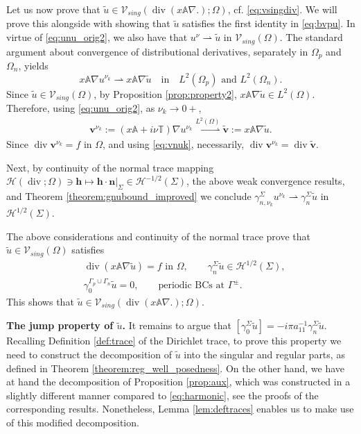 \documentclass[report]{elsarticle}
\numberwithin{theorem}{section}
\renewcommand{\vec}[1]{\mathbf{#1}}
\begin{document}
Let us now prove that $\widetilde{u}\in \mathcal{V}_{sing}(\operatorname{div}(x\mathbb{A}\nabla .); \Omega)$, cf. \eqref{eq:vsingdiv}. We will prove this alongside with showing that $\widetilde{u}$ satisfies the first identity in \eqref{eq:bvpu}. In virtue of \eqref{eq:unu_orig2}, we also have that  $u^{\nu}\rightharpoonup \widetilde{u}$ in $\mathcal{V}_{sing}(\Omega)$. The  standard argument about convergence of distributional derivatives, separately in $\Omega_p$ and $\Omega_n$, yields $$x\mathbb{A}\nabla u^{\nu_k}\rightharpoonup x\mathbb{A}\nabla \widetilde{u}\quad \text{in}\quad  L^2(\Omega_p) \text{ and }L^2(\Omega_n).$$ 
Since $\tilde{u}\in \mathcal{V}_{sing}(\Omega)$, by Proposition \ref{prop:property2}, $x\mathbb{A}\nabla \widetilde{u}\in L^2(\Omega)$. Therefore, using \eqref{eq:unu_orig2}, as $\nu_k\rightarrow 0+$, 
\begin{align}
	\label{eq:vnuk}
	\vec{v}^{\nu_k}:=(x\mathbb{A}+i\nu\mathbb{T})\nabla u^{\nu_k}\overset{L^2(\Omega)}{\rightharpoonup} \widetilde{\vec{v}}:=x\mathbb{A}\nabla \widetilde{u}.
\end{align}
Since $\operatorname{div}\vec{v}^{\nu_k}=f$ in $\Omega$, and using \eqref{eq:vnuk}, necessarily,  $\operatorname{div}\vec{v}^{\nu_k}= \operatorname{div}\widetilde{\vec{v}}.$

Next, by continuity of the normal trace mapping $\mathcal{H}(\operatorname{div};\Omega)\ni\vec{h}\mapsto \left.\vec{h}\cdot \vec{n}\right|_{\Sigma}\in \mathcal{H}^{-1/2}(\Sigma)$, the above weak convergence results, and Theorem \ref{theorem:gnubound_improved} we conclude $\gamma_{n,\nu_k}^{\Sigma}u^{\nu_k}\rightharpoonup \gamma_{n}^{\Sigma}\widetilde{u}$ in $\mathcal{H}^{1/2}(\Sigma)$.  

The above considerations and continuity of the normal trace prove that $\widetilde{u}\in \mathcal{V}_{sing}(\Omega)$ satisfies
\begin{align*}
	&\operatorname{div}(x\mathbb{A}\nabla \widetilde{u})=f \text{ in }\Omega,\qquad\gamma_{n}^{\Sigma}\widetilde{u}\in \mathcal{H}^{1/2}(\Sigma), \\
	&\gamma_0^{\Gamma_p\cup\Gamma_n}\widetilde{u} =0, \qquad\text{periodic BCs at }\Gamma^{\pm}.
\end{align*}
This shows that $\widetilde{u}\in \mathcal{V}_{sing}(\operatorname{div}(x\mathbb{A}\nabla.); \Omega)$. 

\textbf{The jump property of $\widetilde{u}$. }It remains to argue that $[\gamma_0^{\Sigma}\widetilde{u}]=-i\pi a_{11}^{-1}\gamma_n^{\Sigma}\widetilde{u}$. Recalling Definition  \ref{def:trace} of the Dirichlet trace, to prove this property we need to construct the decomposition of $\widetilde{u}$ into the singular and regular parts, as defined in Theorem \ref{theorem:reg_well_posedness}. On the other hand, we have at hand the decomposition of Proposition \ref{prop:aux}, which was constructed in a slightly different manner compared to \eqref{eq:harmonic}, see the proofs of the corresponding results. Nonetheless, Lemma \ref{lem:deftraces} enables us to make use of this modified decomposition.
\end{document}
